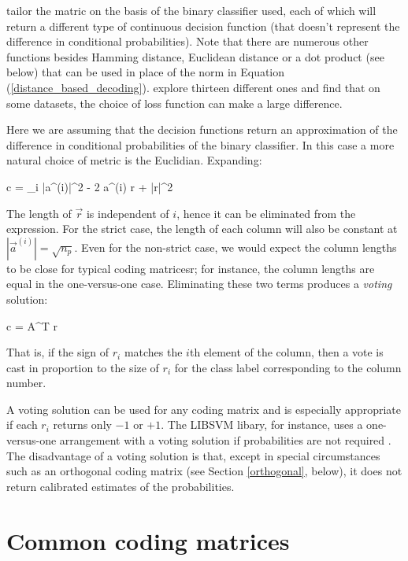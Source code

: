 \citet{Allwein_etal2000} 
tailor the matric on the basis of the binary classifier used, each of which
will return a different type of continuous decision function 
(that doesn't represent the difference in conditional probabilities).
Note that there are numerous other functions besides Hamming distance,
Euclidean distance or a dot product (see below) that can be used in place of the 
norm in Equation (\ref{distance_based_decoding}).
\citet{Escalera_etal2010} explore thirteen different ones and find that on
some datasets, the choice of loss function can make a large difference.

Here we are assuming that the decision functions return an approximation of the 
difference in conditional probabilities of the binary classifier.
In this case a more natural choice of metric is the Euclidian. Expanding:
\begin{eqnnon}
	c = \arg \min_i \left \lbrace |\vec a^{(i)}|^2 - 2 \vec a^{(i)} \cdot \vec r + |\vec r|^2 \right \rbrace
\end{eqnnon}
The length of $\vec r$ is independent of $i$, hence it can be eliminated from the expression.
For the strict case, the length of each column will also be constant at $|\vec a^{(i)}|=\sqrt{n_p}$.
Even for the non-strict case, we would expect the column lengths to be close for typical coding 
matricesr; for instance, the column lengths are equal in the one-versus-one case.
Eliminating these two terms produces a {\it voting} solution:
\begin{eqnnon}
	c = \arg \max A^T \vec r
\end{eqnnon}
That is, if the sign of $r_i$ matches the $i$th element of the column, then a vote is cast 
in proportion to the size of $r_i$ for the class label corresponding to the column number.

A voting solution can be used for any coding matrix and 
is especially appropriate if each $r_i$ returns only $-1$ or $+1$.  
The LIBSVM libary, for instance, uses a one-versus-one arrangement with a voting
solution if probabilities are not required \citep{Chang_Lin2011}.
The disadvantage of a voting solution is
that, except in special circumstances such as an orthogonal coding matrix
(see Section \ref{orthogonal}, below), it does not return calibrated
estimates of the probabilities.

\section{Common coding matrices}

